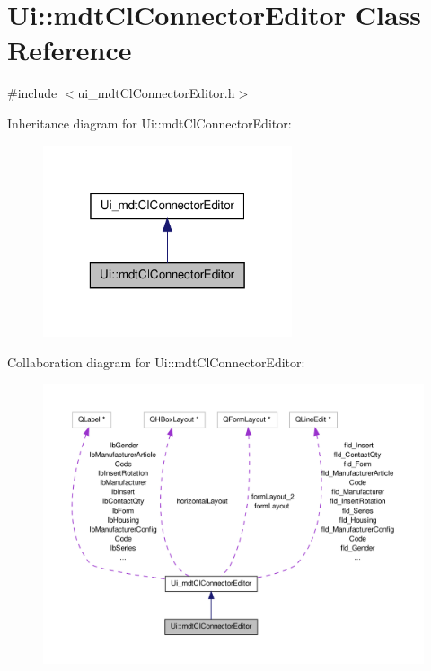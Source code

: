 \hypertarget{class_ui_1_1mdt_cl_connector_editor}{\section{Ui\-:\-:mdt\-Cl\-Connector\-Editor Class Reference}
\label{class_ui_1_1mdt_cl_connector_editor}
}


{\ttfamily \#include $<$ui\-\_\-mdt\-Cl\-Connector\-Editor.\-h$>$}



Inheritance diagram for Ui\-:\-:mdt\-Cl\-Connector\-Editor\-:\nopagebreak
\begin{figure}[H]
\begin{center}
\leavevmode
\includegraphics[width=208pt]{class_ui_1_1mdt_cl_connector_editor__inherit__graph}
\end{center}
\end{figure}


Collaboration diagram for Ui\-:\-:mdt\-Cl\-Connector\-Editor\-:\nopagebreak
\begin{figure}[H]
\begin{center}
\leavevmode
\includegraphics[width=350pt]{class_ui_1_1mdt_cl_connector_editor__coll__graph}
\end{center}
\end{figure}
